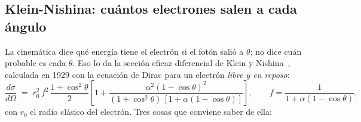 \documentclass[11pt,a4paper]{article}
\begin{document}
\subsection{Klein-Nishina: cuántos electrones salen a cada ángulo}
\label{sec:kn}

La cinemática dice qué energía tiene el electrón si el fotón salió a
$\theta$; no dice cuán probable es cada $\theta$. Eso lo da la sección eficaz
diferencial de Klein y Nishina~\cite{klein1929}, calculada en 1929 con la
ecuación de Dirac para un electrón \emph{libre y en reposo}:
\[
   \frac{d\sigma}{d\Omega} \;=\; r_0^2\, f^2\,
   \frac{1+\cos^2\theta}{2}
   \left[1 + \frac{\alpha^2 (1-\cos\theta)^2}
                  {(1+\cos^2\theta)\,[1+\alpha(1-\cos\theta)]}\right],
   \qquad f = \frac{1}{1 + \alpha(1-\cos\theta)},
\]
con $r_0$ el radio clásico del electrón. Tres cosas que conviene saber de
ella:
\end{document}
